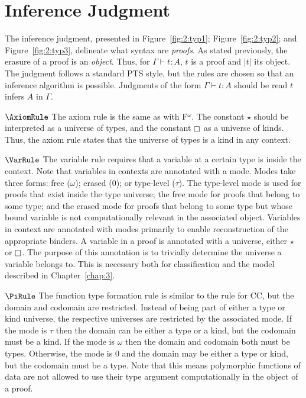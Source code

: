 \section{Inference Judgment}
\label{sec:2:judgments}

The inference judgment, presented in Figure~\ref{fig:2:typ1}; Figure~\ref{fig:2:typ2}; and Figure~\ref{fig:2:typ3}, delineate what syntax are \textit{proofs}.
As stated previously, the erasure of a proof is an \textit{object}.
Thus, for $\Gamma \vdash t : A$, $t$ is a proof and $|t|$ its object.
The judgment follows a standard PTS style, but the rules are chosen so that an inference algorithm is possible.
Judgments of the form $\Gamma \vdash t : A$ should be read $t$ infers $A$ in $\Gamma$.

$\AxiomRule$ The axiom rule is the same as with F$^\omega$.
The constant $\star$ should be interpreted as a universe of types, and the constant $\kind$ as a universe of kinds.
Thus, the axiom rule states that the universe of types is a kind in any context.

$\VarRule$ The variable rule requires that a variable at a certain type is inside the context.
Note that variables in contexts are annotated with a mode.
Modes take three forms: free ($\omega$); erased ($0$); or type-level ($\tau$).
The type-level mode is used for proofs that exist inside the type universe; the free mode for proofs that belong to some type; and the erased mode for proofs that belong to some type but whose bound variable is not computationally relevant in the associated object.
Variables in context are annotated with modes primarily to enable reconstruction of the appropriate binders.
A variable in a proof is annotated with a universe, either $\star$ or $\kind$.
The purpose of this annotation is to trivially determine the universe a variable belongs to.
This is necessary both for classification and the model described in Chapter~\ref{chap:3}.




$\PiRule$ The function type formation rule is similar to the rule for CC, but the domain and codomain are restricted.
Instead of being part of either a type or kind universe, the respective universes are restricted by the associated mode.
If the mode is $\tau$ then the domain can be either a type or a kind, but the codomain must be a kind.
If the mode is $\omega$ then the domain and codomain both must be types.
Otherwise, the mode is $0$ and the domain may be either a type or kind, but the codomain must be a type.
Note that this means polymorphic functions of data are not allowed to use their type argument computationally in the object of a proof.

